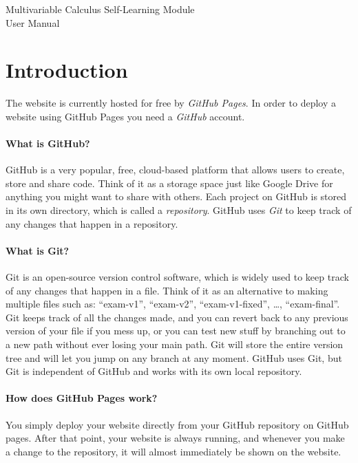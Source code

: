 \documentclass[a4paper,10pt]{article}
\begin{document}
\begingroup
\centering
\LARGE Multivariable Calculus Self-Learning Module\\[1em]
\large User Manual\par
\vspace{32pt}
\endgroup

\tableofcontents

\clearpage

\section{Introduction}

The website is currently hosted for free by \emph{GitHub Pages}. In order to deploy a website using GitHub Pages you need a \emph{GitHub} account. 

\paragraph{What is GitHub?} GitHub is a very popular, free, cloud-based platform that allows users to create, store and share code. Think of it as a storage space just like Google Drive for anything you might want to share with others. Each project on GitHub is stored in its own directory, which is called a \emph{repository}. GitHub uses \emph{Git} to keep track of any changes that happen in a repository.

\paragraph{What is Git?} Git is an open-source version control software, which is widely used to keep track of any changes that happen in a file. Think of it as an alternative to making multiple files such as: ``exam-v1'', ``exam-v2'', ``exam-v1-fixed'', \dots, ``exam-final''. Git keeps track of all the changes made, and you can revert back to any previous version of your file if you mess up, or you can test new stuff by branching out to a new path without ever losing your main path. Git will store the entire version tree and will let you jump on any branch at any moment. GitHub uses Git, but Git is independent of GitHub and works with its own local repository.

\paragraph{How does GitHub Pages work?} You simply deploy your website directly from your GitHub repository on GitHub pages. After that point, your website is always running, and whenever you make a change to the repository, it will almost immediately be shown on the website.
\end{document}

